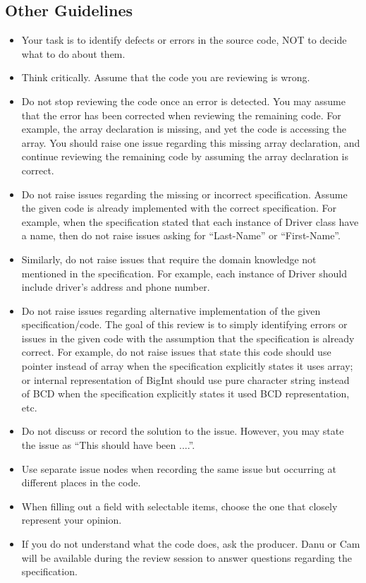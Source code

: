 \subsection*{Other Guidelines}
\begin {itemize}
\item Your task is to identify defects or errors in the source code,
NOT to decide what to do about them.

\item Think critically. Assume that the code you are reviewing is wrong.

\item Do not stop reviewing the code once an error is detected.
You may assume that the error has been corrected when
reviewing the remaining code. For example, the array declaration is
missing, and yet the code is accessing the array. 
You should raise one issue regarding this missing array declaration,
and continue reviewing the remaining code by assuming the array
declaration is correct.

\item Do not raise issues regarding the missing or incorrect
  specification. Assume the given code is already implemented with the 
  correct specification. For example, when the specification stated
  that each instance of Driver class have a name, then do not raise issues
  asking for ``Last-Name'' or ``First-Name''.

\item Similarly, do not raise issues that require the domain
knowledge not mentioned in the specification. For
example, each instance of Driver should include driver's address and
phone number.

\item Do not raise issues regarding alternative implementation of the
  given specification/code. The goal of this review is to simply
  identifying errors or issues in the given code with the assumption that
  the specification is already correct. 
 For example, do not raise issues that state
  this code should   use pointer instead of array when the
  specification explicitly states it uses array; or internal
  representation of BigInt  should use pure character string instead of BCD
  when the specification explicitly states it used BCD representation, etc. 

\item Do not discuss or record the solution to the issue. However, you may
  state the issue as ``This should have been ....''.

\item Use separate issue nodes when recording the same issue but
occurring at different places in the code.

\item When filling out a field with selectable items, choose the one
that closely represent your opinion.

\item If you do not understand what the code does, ask the
producer. Danu or Cam will be available during the review session to
answer questions regarding the specification.

\end{itemize}

